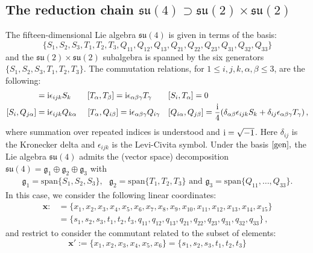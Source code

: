 \documentclass[10pt]{amsart}
\theoremstyle{definition}
\theoremstyle{corollary}
\theoremstyle{remark}
\theoremstyle{conclusion}
\begin{document}
\subsection{The reduction chain $\mathfrak{su}(4) \supset \mathfrak{su}(2) \times \mathfrak{su}(2)$}
\label{subsec3.1}
The fifteen-dimensional Lie algebra $\mathfrak{su}(4)$ is given in terms of the basis: 
\begin{equation}
\{S_1, S_2, S_3, T_1, T_2, T_3, Q_{11}, Q_{12}, Q_{13}, Q_{21}, Q_{22}, Q_{23}, Q_{31}, Q_{32}, Q_{33}\} 
\label{gen}
\end{equation}
and the $\mathfrak{su}(2) \times \mathfrak{su}(2)$ subalgebra is spanned by the six generators $\{S_1, S_2, S_3, T_1, T_2, T_3\}$. The commutation relations, for $1 \leq i,j,k,\alpha,\beta \leq 3$, are the following:
\begin{align}
[S_i, S_j]&={\rm i} \epsilon_{ijk}S_k \qquad [T_\alpha, T_\beta]={\rm i} \epsilon_{\alpha \beta \gamma}T_\gamma \qquad [S_i, T_\alpha]=0 \label{a} \\
[S_i, Q_{j\alpha}]&={\rm i} \epsilon_{ijk} Q_{k \alpha} \quad \,\, [T_\alpha, Q_{i\beta}]={\rm i} \epsilon_{\alpha \beta \gamma} Q_{i \gamma} \quad [Q_{i \alpha}, Q_{j \beta}]=\frac{{\rm i}}{4}(\delta_{\alpha \beta} \epsilon_{ijk}S_k+\delta_{ij}\epsilon_{\alpha \beta \gamma}T_\gamma) \, , \label{b}
\end{align}
where summation over repeated indices is understood and $\rm i = \sqrt{-1}$. Here $\delta_{ij}$ is the Kronecker delta and $\epsilon_{ijk}$ is the Levi-Civita symbol. Under the basis $\eqref{gen},$ the Lie algebra $\mathfrak{su}(4)$ admits the (vector space) decomposition $ \mathfrak{su}(4) = \mathfrak{g}_1 \oplus \mathfrak{g}_2 \oplus \mathfrak{g}_3$ with 
\begin{align*}
   \mathfrak{g}_1 = \mathrm{span} \{S_1,S_2,S_3\} , \text{ } \mathfrak{g}_2 = \mathrm{span} \{T_1,T_2,T_3\} \text{ and } \mathfrak{g}_3 = \mathrm{span} \{Q_{11},\ldots,Q_{33}\}.
\end{align*} In this case, we consider the following linear coordinates: 
\begin{align}
\boldsymbol{x}:&=\{x_1, x_2, x_3, x_4, x_5, x_6,x_7,x_8,x_9,x_{10},x_{11},x_{12}, x_{13}, x_{14}, x_{15}\} \nonumber \\ &=\{s_1,s_2,s_3,t_1,t_2,t_3,q_{11},q_{12},q_{13},q_{21},q_{22},q_{23},q_{31},q_{32},q_{33}\} \, ,
\label{lincoord}
\end{align}
 and restrict to consider the commutant related to the subset of elements: 
 \begin{equation}
 \boldsymbol{x}':= \{x_1, x_2, x_3, x_4, x_5, x_6\} = \{s_1, s_2, s_3, t_1, t_2, t_3\} 
 \label{subalgebcoordin}
 \end{equation}
\end{document}
